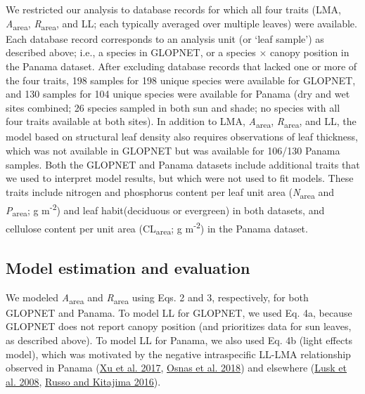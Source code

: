 \documentclass[
  12pt,
  letterpaper,
  DIV=11,
  numbers=noendperiod]{scrartcl}
\begin{document}
We restricted our analysis to database records for which all four traits
(LMA, \emph{A}\textsubscript{area}, \emph{R}\textsubscript{area}, and
LL; each typically averaged over multiple leaves) were available. Each
database record corresponds to an analysis unit (or `leaf sample') as
described above; i.e., a species in GLOPNET, or a species \(\times\)
canopy position in the Panama dataset. After excluding database records
that lacked one or more of the four traits, 198 samples for 198 unique
species were available for GLOPNET, and 130 samples for 104 unique
species were available for Panama (dry and wet sites combined; 26
species sampled in both sun and shade; no species with all four traits
available at both sites). In addition to LMA,
\emph{A}\textsubscript{area}, \emph{R}\textsubscript{area}, and LL, the
model based on structural leaf density also requires observations of
leaf thickness, which was not available in GLOPNET but was available for
106/130 Panama samples. Both the GLOPNET and Panama datasets include
additional traits that we used to interpret model results, but which
were not used to fit models. These traits include nitrogen and
phosphorus content per leaf unit area (\emph{N}\textsubscript{area} and
\emph{P}\textsubscript{area}; g m\textsuperscript{-2}) and leaf
habit(deciduous or evergreen) in both datasets, and cellulose content
per unit area (CL\textsubscript{area}; g m\textsuperscript{-2}) in the
Panama dataset.

\hypertarget{model-estimation-and-evaluation}{%
\subsection{Model estimation and
evaluation}\label{model-estimation-and-evaluation}}

We modeled \emph{A}\textsubscript{area} and \emph{R}\textsubscript{area}
using Eqs. 2 and 3, respectively, for both GLOPNET and Panama. To model
LL for GLOPNET, we used Eq. 4a, because GLOPNET does not report canopy
position (and prioritizes data for sun leaves, as described above). To
model LL for Panama, we also used Eq. 4b (light effects model), which
was motivated by the negative intraspecific LL-LMA relationship observed
in Panama (\protect\hyperlink{ref-Xu2017}{Xu et al. 2017},
\protect\hyperlink{ref-Osnas2018}{Osnas et al. 2018}) and elsewhere
(\protect\hyperlink{ref-Lusk2008}{Lusk et al. 2008},
\protect\hyperlink{ref-Russo2016}{Russo and Kitajima 2016}).
\end{document}
